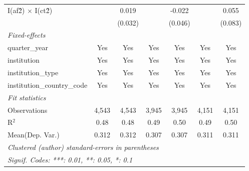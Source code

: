 \begin{tabular}{lcccccc}
   I(af\^2) $\times$ I(ct\^2)         &               & 0.019          &               & -0.022         &               & 0.055\\   
                                      &               & (0.032)        &               & (0.046)        &               & (0.083)\\   
   \midrule
   \emph{Fixed-effects}\\
   quarter\_year                      & Yes           & Yes            & Yes           & Yes            & Yes           & Yes\\  
   institution                        & Yes           & Yes            & Yes           & Yes            & Yes           & Yes\\  
   institution\_type                  & Yes           & Yes            & Yes           & Yes            & Yes           & Yes\\  
   institution\_country\_code         & Yes           & Yes            & Yes           & Yes            & Yes           & Yes\\  
   \midrule
   \emph{Fit statistics}\\
   Observations                       & 4,543         & 4,543          & 3,945         & 3,945          & 4,151         & 4,151\\  
   R$^2$                              & 0.48          & 0.48           & 0.49          & 0.50           & 0.49          & 0.50\\  
Mean(Dep. Var.) & 0.312 & 0.312 & 0.307 & 0.307 & 0.311 & 0.311 \\
   \midrule \midrule
   \multicolumn{7}{l}{\emph{Clustered (author) standard-errors in parentheses}}\\
   \multicolumn{7}{l}{\emph{Signif. Codes: ***: 0.01, **: 0.05, *: 0.1}}\\
\end{tabular}
\par\endgroup
